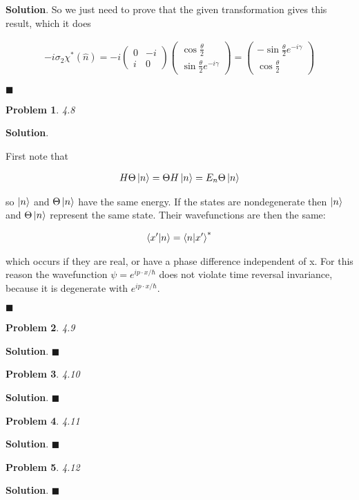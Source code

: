 \documentclass[12pt]{article}
\newtheorem{p}{Problem}
\theoremstyle{definition}
\newenvironment{s}{%
        \begin{trivlist} \item \textbf{Solution}. }{%
            \hspace*{\fill} $\blacksquare$\end{trivlist}}%
\begin{document}
{\begin{s}
So we just need to prove that the given transformation gives this result, which it does

\begin{align*}
-i\sigma_{2}\chi^{*}(\hat{n}) = -i\begin{pmatrix}0&-i\\i&0\end{pmatrix}\begin{pmatrix}\cos\frac{\theta}{2} \\ \sin\frac{\theta}{2}e^{-i\gamma}\end{pmatrix} = \begin{pmatrix}-\sin\frac{\theta}{2}e^{-i\gamma} \\ \cos\frac{\theta}{2} \end{pmatrix}
\end{align*}

\end{s}

\begin{p}
4.8
\end{p}

\begin{s}

First note that 

\begin{align*}
H\Theta\ket{n} = \Theta H \ket{n} = E_{n}\Theta \ket{n}
\end{align*}

so $\ket{n}$ and $\Theta\ket{n}$ have the same energy. If the states are nondegenerate then $\ket{n}$ and $\Theta\ket{n}$ represent the same state. Their wavefunctions are then the same:


\begin{align*}
\bra{x'}\ket{n} = \bra{n}\ket{x'}^{*}
\end{align*}

which occurs if they are real, or have a phase difference independent of x. For this reason the wavefunction $\psi = e^{ip\cdot x/\hbar}$ does not violate time reversal invariance, because it is degenerate with $e^{ip\cdot x/\hbar}$.

\end{s}

\begin{p}
4.9
\end{p}

\begin{s}
\end{s}

\begin{p}
4.10
\end{p}

\begin{s}
\end{s}


\begin{p}
4.11
\end{p}

\begin{s}
\end{s}

\begin{p}
4.12
\end{p}

\begin{s}
\end{s}
\end{document}
